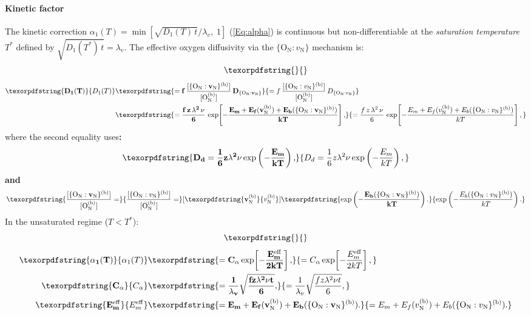 \documentclass[preprint,12pt,sort&compress]{elsarticle}
\newcommand{\?}{\stackrel{?}{=}}
\providecommand{\DIFaddtex}[1]{{\bf #1}} %
\providecommand{\DIFdeltex}[1]{} %
\providecommand{\DIFaddbegin}{\protect\color{blue}} %
\providecommand{\DIFaddend}{\protect\color{black}} %
\providecommand{\DIFdelbegin}{\protect\color{red}} %
\providecommand{\DIFdelend}{\protect\color{black}} %
\providecommand{\DIFadd}[1]{\texorpdfstring{\DIFaddtex{#1}}{#1}} %
\providecommand{\DIFdel}[1]{\texorpdfstring{\DIFdeltex{#1}}{}} %
\begin{document}
\paragraph{Kinetic factor} The kinetic correction $\alpha_1(T) = \min[\sqrt{D_1(T)\,t}/\lambda_v,\; 1]$ (\cref{Eq:alpha}) is continuous but non-differentiable at the \emph{saturation temperature} $T^*$ defined by $\sqrt{D_1(T^*)\,t} = \lambda_v$. The effective oxygen diffusivity via the $\{\text{O}_\text{N} : v_\text{N}\}$ mechanism is:
\DIFdelbegin \begin{displaymath}
\DIFdel{D_1(T) = f\,\frac{[v_\text{N}^{(\text{b})}]}{c_\text{O}}\,D_{\{\text{O}_\text{N}:v_\text{N}\}} = \frac{f\,z\,\lambda^2\,\nu}{6\,c_\text{O}}\,\exp\!\left[-\frac{E_m + E_f(v_\text{N}^{(\text{b})})}{kT}\right],
}\end{displaymath}%
\DIFdelend \DIFaddbegin \begin{align}
\DIFadd{D_1(T) }& \DIFadd{= f\,\frac{[\{\text{O}_\text{N}:v_\text{N}\}^{(\text{b})}]}{[\text{O}_\text{N}^{(\text{b})}]}\,D_{\{\text{O}_\text{N}:v_\text{N}\}} }\\
& \DIFadd{= \frac{f\,z\,\lambda^2\,\nu}{6}\,\exp\!\left[-\frac{E_m + E_f(v_\text{N}^{(\text{b})}) + E_b(\{\text{O}_\text{N}:v_\text{N}\}^{(\text{b})})}{kT}\right],
\label{Eq:App:D1}
}\end{align}\DIFaddend 
where the second equality uses\DIFdelbegin \DIFdel{$D_d = \frac{1}{6}z\lambda^2\nu\exp[-E_m/(kT)]$ and
$[v_\text{N}^{(\text{b})}] = \exp[-E_f(v_\text{N}^{(\text{b})})/(kT)]$. }\DIFdelend \DIFaddbegin \DIFadd{:
}\begin{equation}
\DIFadd{D_d = \frac{1}{6}z\lambda^2\nu\exp\left( - \frac{E_m}{kT} \right), 
}\end{equation}
\DIFadd{and
}\begin{equation}
\DIFadd{\frac{[\{\text{O}_\text{N}:v_\text{N}\}^{(\text{b})}]}{[\text{O}_\text{N}^{(\text{b})}]} = }[\DIFadd{v_\text{N}^{(\text{b})}}] \DIFadd{\exp\left( - \frac{E_b(\{\text{O}_\text{N}:v_\text{N}\}^{(\text{b})})}{kT} \right).
}\end{equation}
\DIFaddend In the unsaturated regime ($T < T^*$):
\DIFdelbegin \begin{displaymath}
\DIFdel{\alpha_1(T) = C_\alpha\,\exp\!\left[-\frac{E_m + E_f(v_\text{N}^{(\text{b})})}{2kT}\right], \quad C_\alpha \equiv \frac{1}{\lambda_v}\sqrt{\frac{f\,z\,\lambda^2\,\nu\,t}{6\,c_\text{O}}}.
}\end{displaymath}%
\DIFdelend \DIFaddbegin \begin{align}
\DIFadd{\alpha_1(T)
}&\DIFadd{=
C_\alpha
\exp\!\left[
-\frac{E_m^\mathrm{eff}}{2kT}
\right],
\label{Eq:App:alpha1Unsat}
}\\
\DIFadd{C_\alpha
}&\DIFadd{=
\frac{1}{\lambda_v}
\sqrt{
\frac{
f z \lambda^2 \nu t
}{6}
},
\label{Eq:App:CAlpha}
}\\
\DIFadd{E_m^\mathrm{eff}
}&\DIFadd{=
E_m
+
E_f(v_\text{N}^{(\text{b})})
+
E_b(\{\text{O}_\text{N}:v_\text{N}\}^{(\text{b})}).
\label{Eq:App:EmEff}
}\end{align}\DIFaddend 
\end{document}
